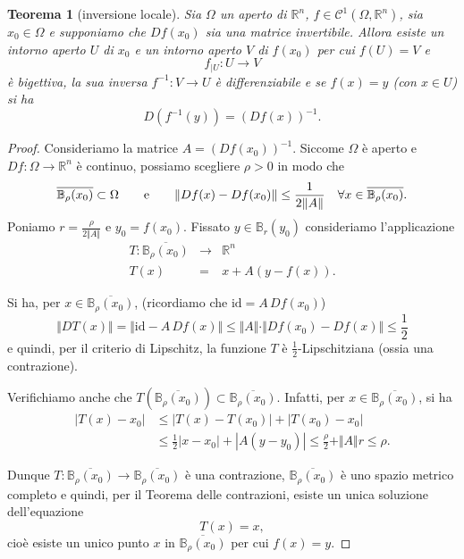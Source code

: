 \documentclass[italian]{article}
\newtheorem{theorem}{Teorema}
\theoremstyle{remark}
\def\text#1{{\mbox{\rm #1}}}            %
\newcommand{\Id}{{\mathrm{id}}}          %
\newcommand{\R}{{\mathbb R}}            %
\newcommand{\CC}{{\mathcal C}}           %
\newcommand{\B}{{\mathbb B}}  %
\def\bea{\begin{eqnarray*}}
\def\eea{\end{eqnarray*}}
\begin{document}
\begin{theorem}[inversione locale]
Sia $\Omega$ un aperto di $\R^n$, $f\in \CC^1(\Omega,\R^n)$,
sia $x_0\in \Omega$ e supponiamo che $Df(x_0)$ 
sia una matrice invertibile.
Allora esiste un intorno aperto $U$ di $x_0$ e un intorno aperto $V$ di $f(x_0)$
per cui $f(U)=V$ e
\[
        f_{|U}\colon U\to V
\]
\`e bigettiva, la sua inversa $f^{-1}\colon V\to U$ \`e differenziabile e se $f(x)=y$ (con $x\in
U$) si ha
\[
        D(f^{-1}(y))=(Df(x))^{-1}.
\]
\end{theorem}
\begin{proof}
Consideriamo la matrice $A=(Df(x_0))^{-1}$. 
Siccome $\Omega$ \`e aperto e $Df\colon
\Omega\to \R^n$ \`e continuo, possiamo scegliere $\rho>0$ in modo che
\[    
    \overline{\B_\rho(x_0)}\subset \Omega
\qquad \text{e} \qquad
        \Vert Df(x)-Df(x_0)\Vert \le \frac{1}{2\Vert A\Vert}
                \quad\forall x\in \overline{\B_\rho(x_0)}.
\]
Poniamo $r=\frac{\rho}{2\Vert A\Vert}$ e
$y_0=f(x_0)$.  Fissato $y\in \B_r(y_0)$
consideriamo l'applicazione
\bea
        T\colon \overline{\B_\rho(x_0)}&\to& \R^n\\
        T(x)&=& x + A(y-f(x)).
\eea

Si ha, per $x\in \overline{\B_\rho(x_0)}$, (ricordiamo che $\Id = A\, Df(x_0)$)
\[
        \Vert DT(x)\Vert=\Vert \Id-A\, Df(x)\Vert \le 
        \Vert A \Vert\cdot\Vert Df(x_0)-Df(x)\Vert
        \le \frac{1}{2}
\]
e quindi, per il criterio di Lipschitz, la funzione $T$ \`e $\frac 1
2$-Lipschitziana (ossia una contrazione).

Verifichiamo anche che $T(\overline{\B_\rho(x_0)})\subset \overline{\B_\rho(x_0)}$.
Infatti, per $x\in \overline{\B_\rho(x_0)}$, si ha
        \begin{align*}
        |T(x)-x_0|&\le |T(x)-T(x_0)|+|T(x_0)-x_0|\\
        &\le \frac 1 2 |x-x_0| + |A (y-y_0)|
        \le \frac \rho 2 + \Vert A\Vert  r
        \le \rho.
        \end{align*}

Dunque $T\colon\overline{\B_\rho(x_0)}\to \overline{\B_\rho(x_0)}$ \`e una
contrazione, $\overline{\B_\rho(x_0)}$ \`e uno spazio metrico completo
e quindi, per il Teorema delle contrazioni, 
esiste un unica soluzione dell'equazione
        \[
        T(x)=x,
        \]
cio\`e esiste un unico punto $x$ in $\overline{\B_\rho(x_0)}$ per cui $f(x)=y$.


\end{proof}
\end{document}
